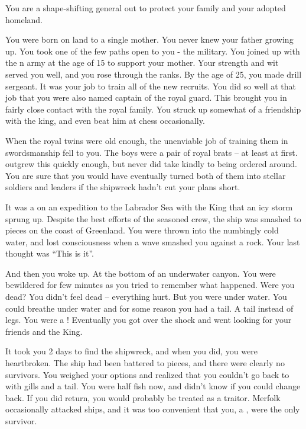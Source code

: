 \documentclass[char]{NeptuneBall}
\begin{document}
\name{\cGeneral{}}



You are a shape-shifting general out to protect your family and your adopted homeland.

You were born on land to a single mother. You never knew your father growing up. You took one of the few paths open to you - the military. You joined up with the \pAmerica{}n army at the age of 15 to support your mother. Your strength and wit served you well, and you rose through the ranks. By the age of 25, you made drill sergeant. It was your job to train all of the new recruits. You did so well at that job that you were also named captain of the royal guard. This brought you in fairly close contact with the royal family. You struck up somewhat of a friendship with the king, and even beat him at chess occasionally.

When the royal twins were old enough, the unenviable job of training them in swordsmanship fell to you. The boys were a pair of royal brats -- at least at first. \cEric{} outgrew this quickly enough, but \cSlave{} never did take kindly to being ordered around. You are sure that you would have eventually turned both of them into stellar soldiers and leaders if the shipwreck hadn't cut your plans short.

It was a on an expedition to the Labrador Sea with the King that an icy storm sprung up. Despite the best efforts of the seasoned crew, the ship was smashed to pieces on the coast of Greenland. You were thrown into the numbingly cold water, and lost consciousness when a wave smashed you against a rock. Your last thought was ``This is it''.

And then you woke up. At the bottom of an underwater canyon. You were bewildered for few minutes as you tried to remember what happened. Were you dead? You didn't feel dead -- everything hurt. But you were under water. You could breathe under water and for some reason you had a tail. A tail instead of legs. You were a \cGeneral{\mer}! Eventually you got over the shock and went looking for your friends and the King.

It took you 2 days to find the shipwreck, and when you did, you were heartbroken. The ship had been battered to pieces, and there were clearly no survivors. You  weighed your options and realized that you couldn't go back to \pAmerica{} with gills and a tail. You were half fish now, and didn't know if you could change back. If you did return, you would probably be treated as a traitor. Merfolk occasionally attacked ships, and it was too convenient that you, a \cGeneral{\mer}, were the only survivor.
\end{document}

